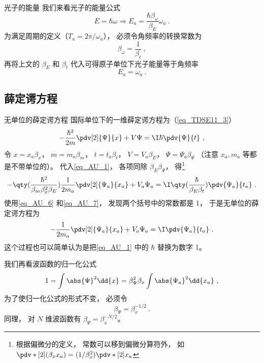 \begin{example}{光子的能量}
我们来看光子的能量公式 %
\begin{equation}
E = \hbar \omega \Longrightarrow E_a = \frac{\hbar\beta_\omega}{\beta_E}\omega_a~.
\end{equation}
为满足周期的定义（$T_a = 2\pi/\omega_a$）， 必须令角频率的转换常数为
\begin{equation}
\beta_\omega = \frac{1}{\beta_t}~,
\end{equation}
再将上文的 $\beta_E$ 和 $\beta_t$ 代入可得原子单位下光子能量等于角频率
\begin{equation}\label{eq_AU_2}
E_a = \omega_a~.
\end{equation}
\end{example}

\subsection{薛定谔方程}
\begin{example}{无单位的薛定谔方程}\label{ex_AU_1}
国际单位下的一维薛定谔方程为（\autoref{eq_TDSE11_3}）
\begin{equation}\label{eq_AU_1}
-\frac{\hbar^2}{2m} \pdv[2]{\Psi}{x} + V\Psi= \I\hbar \pdv{\Psi}{t}~,
\end{equation}
令 $x = x_a\beta_x$， $m = m_a\beta_m$， $t = t_a\beta_t$， $V = V_a\beta_E$， $\Psi = \Psi_a \beta_\Psi$ （注意 $x_a, m_a$ 等都是不带单位的）。
代入\autoref{eq_AU_1}， 各项同除 $\beta_E\beta_\Psi$， 得\footnote{根据偏微分的定义， 常数可以移到偏微分算符外， 如 $\pdv*[2]{(\beta_x x_a)} = (1/\beta_x^2) \pdv*[2]{x_a}$}
\begin{equation}\label{eq_AU_3}
-\qty(\frac{\hbar^2}{\beta_m\beta_x^2\beta_E})\frac{1}{2m_a} \pdv[2]{\Psi_a}{x_a} + V_a\Psi_a= \I\qty(\frac{\hbar}{\beta_E\beta_t})\pdv{\Psi_a}{t_a}~.
\end{equation}
使用\autoref{eq_AU_6} 和\autoref{eq_AU_7}， 发现两个括号中的常数都是 1， 于是无单位的薛定谔方程为
\begin{equation}\label{eq_AU_4}
-\frac{1}{2m_a} \pdv[2]{\Psi_a}{x_a} + V_a\Psi_a= \I\pdv{\Psi_a}{t_a}~.
\end{equation}
这个过程也可以简单认为是把\autoref{eq_AU_1} 中的 $\hbar$ 替换为数字 1。

我们再看波函数的归一化公式
\begin{equation}\label{eq_AU_13}
1 = \int \abs{\Psi}^2 \dd{x} = \beta_\Psi^2 \beta_x \int \abs{\Psi_a}^2 \dd{x_a}~,
\end{equation}
为了使归一化公式的形式不变， 必须令
\begin{equation}\label{eq_AU_5}
\beta_\Psi = \beta_x^{-1/2}~.
\end{equation}
同理， 对 $N$ 维波函数有 $\beta_\Psi = \beta_x^{-N/2}$。
\end{example}

